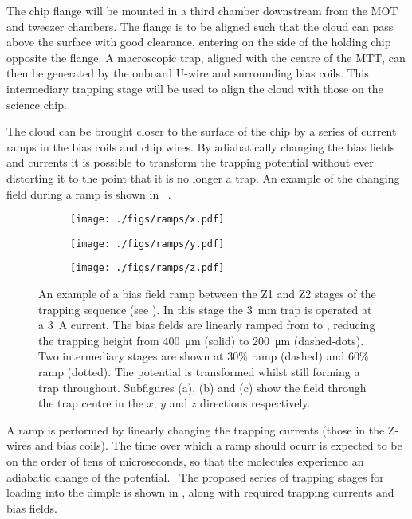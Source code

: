 The chip flange will be mounted in a third chamber downstream from the MOT and
tweezer chambers. The flange is to be aligned such that the cloud can pass above
the surface with good clearance, entering on the side of the holding chip opposite
the flange. A macroscopic trap, aligned with the centre of the MTT, can then be
generated by the onboard U-wire and surrounding bias coils. This intermediary
trapping stage will be used to align the cloud with those on the science chip.

The cloud can be brought closer to the surface of the chip by a series of
current ramps in the bias coils and chip wires. By adiabatically changing the
bias fields and currents it is possible to transform the trapping potential
without ever distorting it to the point that it is no longer a trap. An example
of the changing field during a ramp is shown in
~. 

\begin{figure}[ht]
  \centering
  \begin{subfigure}{0.6\textwidth}
    \centering
    \texttt{[image: ./figs/ramps/x.pdf]}
    \caption{}
  \end{subfigure}
  \begin{subfigure}{0.6\textwidth}
    \centering
    \texttt{[image: ./figs/ramps/y.pdf]}
    \caption{}
  \end{subfigure}
  \begin{subfigure}{0.6\textwidth}
    \centering
    \texttt{[image: ./figs/ramps/z.pdf]}
    \caption{}
  \end{subfigure}
  \caption{
    An example of a bias field ramp between the Z1 and Z2 stages of the trapping
    sequence (see ). In this stage the
    \SI{3}{\milli\metre} trap is operated at a \SI{3}{\ampere} current. The bias
    fields are linearly ramped from  to , reducing the
    trapping height from \SI{400}{\micro\metre} (solid) to
    \SI{200}{\micro\metre} (dashed-dots). Two intermediary stages are shown at
    30\% ramp (dashed) and 60\% ramp (dotted). The potential is transformed
    whilst still forming a trap throughout. Subfigures (a), (b) and (c) show the
    field through the trap centre in the $x$, $y$ and $z$ directions
    respectively.
  }
  \label{experiment:fig:ramptraps}
\end{figure}

A ramp is performed by linearly changing the trapping currents (those in the
Z-wires and bias coils). The time over which a ramp should ocurr is expected to
be on the order of tens of microseconds, so that the molecules experience an
adiabatic change of the potential.~\cite{Boehi2009} The proposed series of
trapping stages for loading into the dimple is shown in
, along with required trapping currents and
bias fields.

